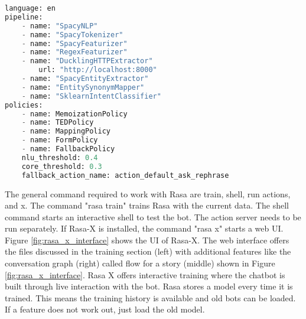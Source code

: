 \begin{lstlisting}[caption={Rasa Configuration}, label={lst:rasa_config},captionpos=b,frame=single,language={Python},commentstyle=\color{mygreen},keywordstyle=\color{blue},
    morekeywords={language, pipeline, policies, name}]                
language: en
pipeline: 
    - name: "SpacyNLP"
    - name: "SpacyTokenizer"
    - name: "SpacyFeaturizer"
    - name: "RegexFeaturizer"
    - name: "DucklingHTTPExtractor"
        url: "http://localhost:8000"
    - name: "SpacyEntityExtractor"
    - name: "EntitySynonymMapper"
    - name: "SklearnIntentClassifier"
policies:
    - name: MemoizationPolicy
    - name: TEDPolicy
    - name: MappingPolicy
    - name: FormPolicy
    - name: FallbackPolicy
    nlu_threshold: 0.4
    core_threshold: 0.3
    fallback_action_name: action_default_ask_rephrase
\end{lstlisting} 
The general command required to work with Rasa are train, shell, run actions, and x.
The command "rasa train" trains Rasa with the current data.
The shell command starts an interactive shell to test the bot.
The action server needs to be run separately.
If Rasa-X is installed, the command "rasa x" starts a web UI.
Figure \ref{fig:rasa_x_interface} shows the UI of Rasa-X.
The web interface offers the files discussed in the training section (left) with additional features like the conversation graph (right) called flow for a story (middle) shown in Figure \ref{fig:rasa_x_interface}.
Rasa X offers interactive training where the chatbot is built through live interaction with the bot. 
Rasa stores a model every time it is trained.
This means the training history is available and old bots can be loaded.
If a feature does not work out, just load the old model.

